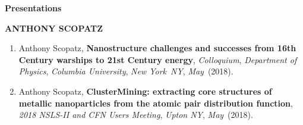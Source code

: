 \documentclass[prl,tighten,amsmath,amssymb,floatfix]{revtex4-1}
\begin{document}
\textbf{Presentations}

\textbf{ANTHONY SCOPATZ}
\vskip 12pt

\begin{enumerate}

\item Anthony Scopatz, {\bf Nanostructure challenges and successes from 16th Century warships to 21st Century energy},
{\it Colloquium},
{\it Department of Physics},
{\it Columbia University},
{\it New York}\
{\it NY},
{\it May}\
(2018).

\item Anthony Scopatz, {\bf ClusterMining: extracting core structures of metallic nanoparticles from the atomic pair distribution function},
{\it 2018 NSLS-II and CFN Users Meeting},
{\it Upton NY},
{\it May}\
(2018).

\end{enumerate}
\end{document}
